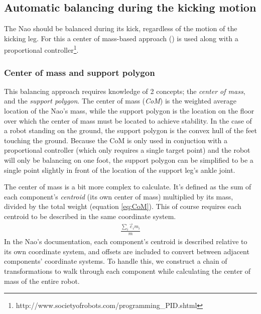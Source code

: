 \documentclass[a4paper]{article}
\begin{document}
\subsection{Automatic balancing during the kicking motion}
The Nao should be balanced during its kick, regardless of the motion of the
kicking leg. For this a center of mass-based approach (\cite{Xu2010}) is used
along with a proportional
controller\footnote{http://www.societyofrobots.com/programming\_PID.shtml}.

\subsubsection{Center of mass and support polygon}
This balancing approach requires knowledge of 2 concepts; the \emph{center of mass},
and the \emph{support polygon}. The center of mass (\emph{CoM}) is the weighted average
location of the Nao’s mass, while the support polygon is the location on the
floor over which the center of mass must be located to achieve stability. In the
case of a robot standing on the ground, the support polygon is the convex hull
of the feet touching the ground. Because the CoM is only used in conjuction with
a proportional controller (which only requires a single target point) and the
robot will only be balancing on one foot, the support polygon can be simplified
to be a single point slightly in front of the location of the support leg's ankle
joint.

The center of mass is a bit more complex to calculate. It's defined as the sum
of each component’s \emph{centroid} (its own center of mass) multiplied by its
mass, divided by the total weight (equation \ref{eq:CoM}). This of course
requires each centroid to be described in the same coordinate system.
\begin{align}
  \frac{\sum_i \vec{c}_i m_i} {m}        \label{eq:CoM}
\end{align}
In the Nao’s documentation, each component's centroid is described relative to
its own coordinate system, and offsets are included to convert between adjacent
components’ coordinate systems. To handle this, we construct a chain of
transformations to walk through each component while calculating the center of
mass of the entire robot.
\end{document}
